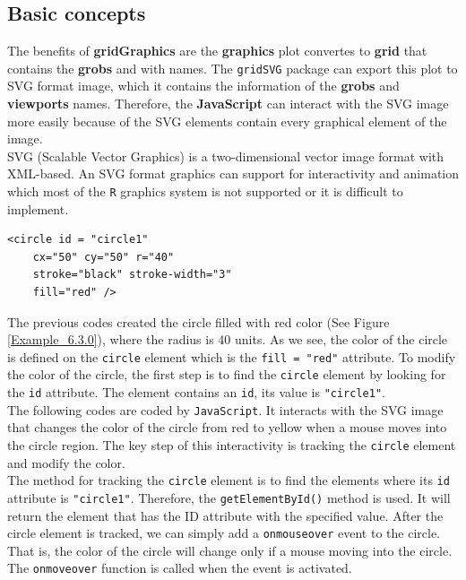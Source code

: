 \documentclass[11pt,twoside]{report}
\begin{document}
\subsection{Basic concepts}
The benefits of \textbf{gridGraphics} are the \textbf{graphics} plot convertes to \textbf{grid} that contains the \textbf{grobs} and  with names. The \texttt{gridSVG} \citep{gridSVG} package can export this plot to SVG format image, which it contains the information of the \textbf{grobs} and \textbf{viewports} names. Therefore, the \textbf{JavaScript} \citep{javascript} can interact with the SVG image more easily because of the SVG elements contain every graphical element of the image.\\

SVG (Scalable Vector Graphics) \citep{SVG} is a two-dimensional vector image format with XML-based. An SVG format graphics can support for interactivity and animation which most of the \texttt{R} graphics system is not supported or it is difficult to implement.

\begin{lstlisting}
<circle id = "circle1" 
    cx="50" cy="50" r="40" 
    stroke="black" stroke-width="3" 
    fill="red" />
\end{lstlisting}

The previous codes created the circle filled with red color (See Figure \ref{Example_6.3.0}), where the radius is 40 units. As we see, the color of the circle is defined on the \texttt{circle} element which is the \texttt{fill = "red"} attribute. To modify the color of the circle, the first step is to find the \texttt{circle} element by looking for the \texttt{id} attribute. The element contains an \texttt{id}, its value is \texttt{"circle1"}.\\

The following codes are coded by \texttt{JavaScript}. It interacts with the SVG image that changes the color of the circle from red to yellow when a mouse moves into the circle region. The key step of this interactivity is tracking the \texttt{circle} element and modify the color.\\

The method for tracking the \texttt{circle} element is to find the elements where its \texttt{id} attribute is \texttt{"circle1"}. Therefore, the \texttt{getElementById()} method is used. It will return the element that has the ID attribute with the specified value. After the circle element is tracked, we can simply add a \texttt{onmouseover} event to the circle. That is, the color of the circle will change only if a mouse moving into the circle. The \texttt{onmoveover} function is called when the event is activated.\\ 
\end{document}
